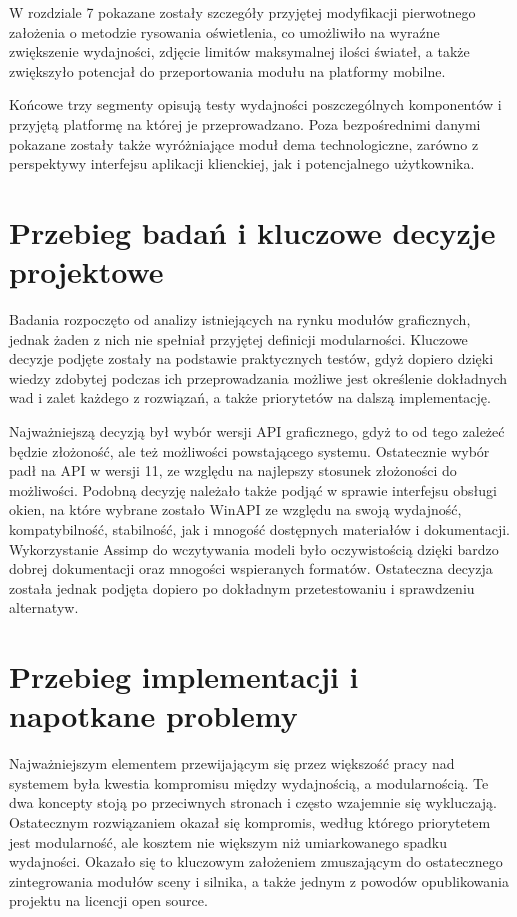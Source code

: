 W rozdziale 7 pokazane zostały szczegóły przyjętej modyfikacji pierwotnego założenia o metodzie rysowania oświetlenia, co umożliwiło na wyraźne zwiększenie wydajności, zdjęcie limitów maksymalnej ilości świateł, a także zwiększyło potencjał do przeportowania modułu na platformy mobilne. 

Końcowe trzy segmenty opisują testy wydajności poszczególnych komponentów i przyjętą platformę na której je przeprowadzano. Poza bezpośrednimi danymi pokazane zostały także wyróżniające moduł dema technologiczne, zarówno z perspektywy interfejsu aplikacji klienckiej, jak i potencjalnego użytkownika. 

\section{Przebieg badań i kluczowe decyzje projektowe}
Badania rozpoczęto od analizy istniejących na rynku modułów graficznych, jednak żaden z nich nie spełniał przyjętej definicji modularności. Kluczowe decyzje podjęte zostały na podstawie praktycznych testów, gdyż dopiero dzięki wiedzy zdobytej podczas ich przeprowadzania możliwe jest określenie dokładnych wad i zalet każdego z rozwiązań, a także priorytetów na dalszą implementację.

Najważniejszą decyzją był wybór wersji API graficznego, gdyż to od tego zależeć będzie złożoność, ale też możliwości powstającego systemu. Ostatecznie wybór padł na API w wersji 11, ze względu na najlepszy stosunek złożoności do możliwości. Podobną decyzję należało także podjąć w sprawie interfejsu obsługi okien, na które wybrane zostało WinAPI ze względu na swoją wydajność, kompatybilność, stabilność, jak i mnogość dostępnych materiałów i dokumentacji. Wykorzystanie Assimp do wczytywania modeli było oczywistością dzięki bardzo dobrej dokumentacji oraz mnogości wspieranych formatów. Ostateczna decyzja została jednak podjęta dopiero po dokładnym przetestowaniu i sprawdzeniu alternatyw. 

\section{Przebieg implementacji i napotkane problemy}
Najważniejszym elementem przewijającym się przez większość pracy nad systemem była kwestia kompromisu między wydajnością, a modularnością. Te dwa koncepty stoją po przeciwnych stronach i często wzajemnie się wykluczają. Ostatecznym rozwiązaniem okazał się kompromis, według którego priorytetem jest modularność, ale kosztem nie większym niż umiarkowanego spadku wydajności. Okazało się to kluczowym założeniem zmuszającym do ostatecznego zintegrowania modułów sceny i silnika, a także jednym z powodów opublikowania projektu na licencji open source. 

